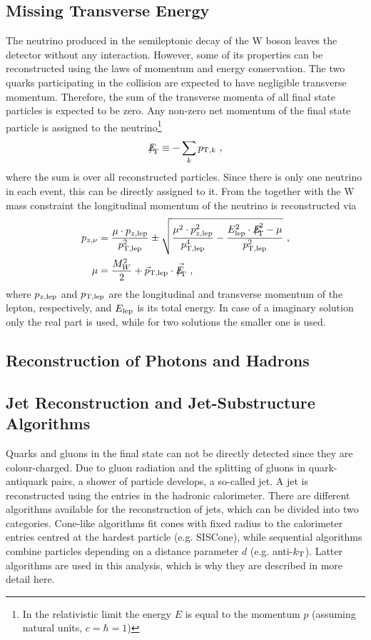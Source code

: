 \subsection{Missing Transverse Energy}
The neutrino produced in the semileptonic decay of the W boson leaves the detector without any interaction. However, some of its properties can be reconstructed using the laws of momentum and energy conservation. The two quarks participating in the collision are expected to have negligible transverse momentum. Therefore, the sum of the transverse momenta of all final state particles is expected to be zero. Any non-zero net momentum of the final state particle is assigned to the neutrino\footnote{In the relativistic limit the energy $E$ is equal to the momentum $p$ (assuming natural units, $c=\hbar=1$)}\cite{MET}
\begin{equation}
{E\!\!\!\!/}_{\!\mathrm{T}} \equiv -\sum_k p_{{\rm T},k} ~,
\end{equation}
where the sum is over all reconstructed particles. Since there is only one neutrino in each event, this \MET can be directly assigned to it. From the \MET together with the W mass constraint the longitudinal momentum of the neutrino is reconstructed \cite{PAS} via
\begin{align}
p_{z,\nu} &= \frac{\mu \cdot p_{z,{\rm lep}}}{p_{\rm T,lep}^2} \pm \sqrt{\frac{\mu^2 \cdot p_{z,{\rm lep}}^2}{p_{\rm T,lep}^4} - \frac{E_{\rm lep}^2 \cdot \MET^2 - \mu}{p_{\rm T,lep}^2}} ~, \\
\mu &= \frac{M_W^2}{2} + \vec{p}_{\rm T,lep}\cdot \vec{\MET} ~,
\end{align} 
where $p_{z,{\rm lep}}$ and $p_{\rm T,lep}$ are the longitudinal  and transverse momentum of the lepton, respectively, and $E_{\rm lep}$ is its total energy. In case of a imaginary solution only the real part is used, while for two solutions the smaller one is used.
\subsection{Reconstruction of Photons and Hadrons}
\subsection{Jet Reconstruction and Jet-Substructure Algorithms}
\label{sec:jetreco}
\label{sec:pruning}
Quarks and gluons in the final state can not be directly detected since they are colour-charged. Due to gluon radiation and the splitting of gluons in quark-antiquark pairs, a shower of particle develops, a so-called jet. A jet is reconstructed using the entries in the hadronic calorimeter. There are different algorithms available for the reconstruction of jets, which can be divided into two categories. Cone-like algorithms fit cones with fixed radius to the calorimeter entries centred at the hardest particle (e.g. SISCone), while sequential algorithms combine particles depending on a distance parameter $d$ (e.g. anti-$k_{\rm T}$). Latter algorithms are used in this analysis, which is why they are described in more detail here.\\

